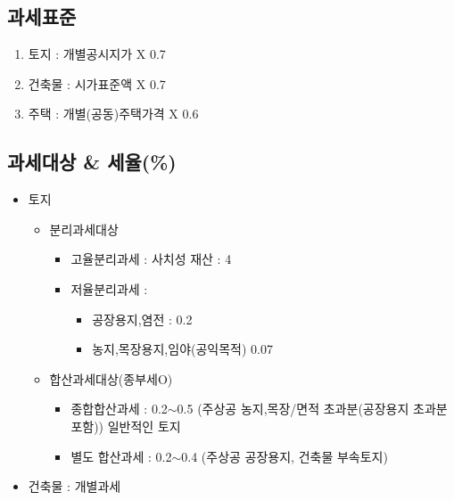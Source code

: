 \documentclass{oblivoir}
\begin{document}
\begin{multicols}{2}
\subsection{과세표준}\label{uxacfcuxc138uxd45cuxc900}

\begin{enumerate}
\def\labelenumi{\arabic{enumi}.}
\itemsep1pt\parskip0pt
\item
  토지 : 개별공시지가 X 0.7
\item
  건축물 : 시가표준액 X 0.7
\item
  주택 : 개별(공동)주택가격 X 0.6
\end{enumerate}

\subsection{과세대상 \&
세율(\%)}\label{uxacfcuxc138uxb300uxc0c1-uxc138uxc728}

\begin{itemize}
\itemsep1pt\parskip0pt
\item
  토지

  \begin{itemize}
  \itemsep1pt\parskip0pt
  \item
    분리과세대상

    \begin{itemize}
    \itemsep1pt\parskip0pt
    \item
      고율분리과세 : 사치성 재산 : 4
    \item
      저율분리과세 :

      \begin{itemize}
      \itemsep1pt\parskip0pt
      \item
        공장용지,염전 : 0.2
      \item
        농지,목장용지,임야(공익목적) 0.07
      \end{itemize}
    \end{itemize}
  \item
    합산과세대상(종부세O)

    \begin{itemize}
    \itemsep1pt\parskip0pt
    \item
      종합합산과세 : 0.2$\sim$0.5 (주상공 농지,목장/면적
      초과분(공장용지 초과분 포함)) 일반적인 토지
    \item
      별도 합산과세 : 0.2$\sim$0.4 (주상공 공장용지, 건축물
      부속토지)
    \end{itemize}
  \end{itemize}
\item
  건축물 : 개별과세


\end{itemize}
\end{multicols}
\end{document}
